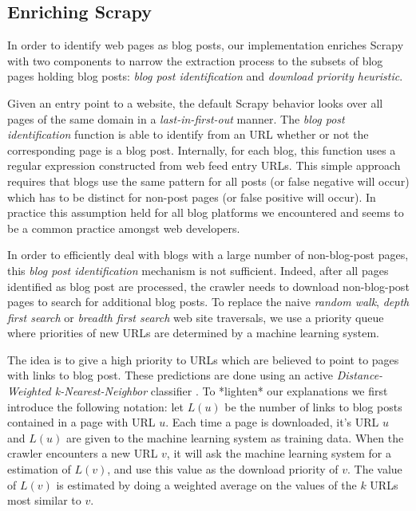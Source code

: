 \subsection{Enriching Scrapy}\label{enrichingscrapy}
In order to identify web pages as blog posts, our implementation enriches Scrapy with two components to narrow the extraction process to the subsets of blog pages holding blog posts: \emph{blog post identification} and \emph{download priority heuristic}.

Given an entry point to a website, the default Scrapy behavior looks over all pages of the same domain in a \emph{last-in-first-out} manner. The \emph{blog post identification} function is able to identify from an URL whether or not the corresponding page is a blog post. Internally, for each blog, this function uses a regular expression constructed from web feed entry URLs. This simple approach requires that blogs use the same pattern for all posts (or false negative will occur) which has to be distinct for non-post pages (or false positive will occur). In practice this assumption held for all blog platforms we encountered and seems to be a common practice amongst web developers.

In order to efficiently deal with blogs with a large number of non-blog-post pages, this \emph{blog post identification} mechanism is not sufficient. Indeed, after all pages identified as blog post are processed, the crawler needs to download non-blog-post pages to search for additional blog posts. To replace the naive \emph{random walk}, \emph{depth first search} or \emph{breadth first search} web site traversals, we use a priority queue where priorities of new URLs are determined by a machine learning system.

The idea is to give a high priority to URLs which are believed to point to pages with links to blog post. These predictions are done using an active \emph{Distance-Weighted k-Nearest-Neighbor} classifier \cite{dudani1976}. To *lighten* our explanations we first introduce the following notation: let $L(u)$ be the number of links to blog posts contained in a page with URL $u$. Each time a page is downloaded, it's URL $u$ and $L(u)$ are given to the machine learning system as training data. When the crawler encounters a new URL $v$, it will ask the machine learning system for a estimation of $L(v)$, and use this value as the download priority of $v$. The value of $L(v)$ is estimated by doing a weighted average on the values of the $k$ URLs most similar to $v$.

